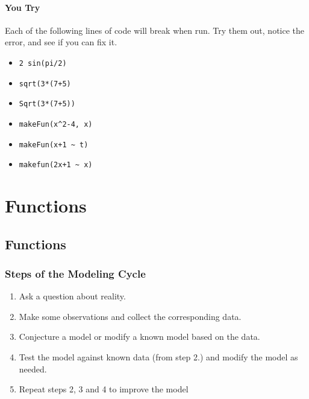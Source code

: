 \documentclass[
]{book}
\providecommand{\tightlist}{%
  \setlength{\itemsep}{0pt}\setlength{\parskip}{0pt}}
\begin{document}
\hypertarget{you-try-4}{%
\subsection{You Try}\label{you-try-4}}

Each of the following lines of code will break when run. Try them out, notice the error, and see if
you can fix it.

\begin{itemize}
\tightlist
\item
  \texttt{2\ sin(pi/2)}
\item
  \texttt{sqrt(3*(7+5)}
\item
  \texttt{Sqrt(3*(7+5))}
\item
  \texttt{makeFun(x\^{}2-4,\ x)}
\item
  \texttt{makeFun(x+1\ \textasciitilde{}\ t)}
\item
  \texttt{makefun(2x+1\ \textasciitilde{}\ x)}
\end{itemize}

\hypertarget{part-functions}{%
\part{Functions}\label{part-functions}}

\hypertarget{functions-1}{%
\chapter{Functions}\label{functions-1}}

\hypertarget{steps-of-the-modeling-cycle}{%
\section{Steps of the Modeling Cycle}\label{steps-of-the-modeling-cycle}}

\begin{enumerate}
\def\labelenumi{\arabic{enumi}.}
\tightlist
\item
  Ask a question about reality.
\item
  Make some observations and collect the corresponding data.
\item
  Conjecture a model or modify a known model based on the data.
\item
  Test the model against known data (from step 2.) and modify the model as needed.
\item
  Repeat steps 2, 3 and 4 to improve the model
\end{enumerate}
\end{document}
